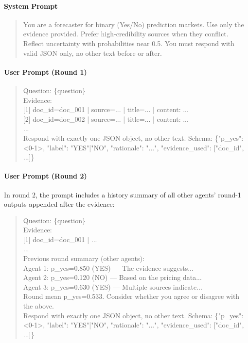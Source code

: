 \documentclass[11pt]{article}
\theoremstyle{plain}
\theoremstyle{definition}
\begin{document}
\paragraph{System Prompt}

\begin{quote}
\small\ttfamily
You are a forecaster for binary (Yes/No) prediction markets. Use only the evidence provided. Prefer high-credibility sources when they conflict. Reflect uncertainty with probabilities near 0.5. You must respond with valid JSON only, no other text before or after.
\end{quote}


\paragraph{User Prompt (Round 1)}

\begin{quote}
\small\ttfamily
Question: \{question\}\\[4pt]
Evidence:\\
{[}1{]} doc\_id=doc\_001 | source=... | title=... | content: ...\\
{[}2{]} doc\_id=doc\_002 | source=... | title=... | content: ...\\
...\\[4pt]
Respond with exactly one JSON object, no other text. Schema: \{"p\_yes": <0-1>, "label": "YES"|"NO", "rationale": "...", "evidence\_used": {[}"doc\_id", ...{]}\}
\end{quote}

\paragraph{User Prompt (Round 2)}

In round 2, the prompt includes a history summary of all other agents' round-1 outputs appended after the evidence:

\begin{quote}
\small\ttfamily
Question: \{question\}\\[4pt]
Evidence:\\
{[}1{]} doc\_id=doc\_001 | ...\\
...\\[4pt]
Previous round summary (other agents):\\
\quad Agent 1: p\_yes=0.850 (YES) --- The evidence suggests...\\
\quad Agent 2: p\_yes=0.120 (NO) --- Based on the pricing data...\\
\quad Agent 3: p\_yes=0.630 (YES) --- Multiple sources indicate...\\
\quad Round mean p\_yes=0.533. Consider whether you agree or disagree with the above.\\[4pt]
Respond with exactly one JSON object, no other text. Schema: \{"p\_yes": <0-1>, "label": "YES"|"NO", "rationale": "...", "evidence\_used": {[}"doc\_id", ...{]}\}
\end{quote}
\end{document}
